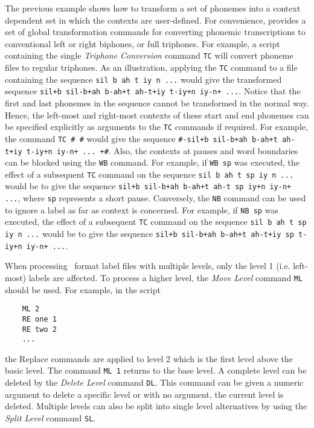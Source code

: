 The previous example shows how to transform a set of phonemes into a
context dependent set in which the contexts are user-defined.
 For
convenience,  provides a set of global transformation commands
for converting phonemic transcriptions to conventional left or right
biphones, or full triphones.  For example, a script containing the single
{\it Triphone Conversion} command \texttt{TC} will convert phoneme 
files to regular
triphones.  As an illustration, applying the \texttt{TC} command to a file
containing the sequence \texttt{sil b ah t iy n ...} would  give the
transformed sequence 
\texttt{sil+b sil-b+ah b-ah+t ah-t+iy t-iy+n iy-n+ ...}. Notice that the
first and last phonemes in the sequence  cannot be transformed in the
normal way.  Hence, the left-most and right-most contexts of these
start and end phonemes can be specified
explicitly as arguments to the \texttt{TC} commands if required.  For
example, the command \texttt{TC \# \#} would give the sequence
\texttt{\#-sil+b sil-b+ah b-ah+t ah-t+iy t-iy+n iy-n+ ... +\#}.  
Also, the contexts at pauses and word boundaries can be blocked
using the
\texttt{WB} command.   For example, if \texttt{WB sp} was executed, the
effect of a subsequent \texttt{TC} command on the sequence 
\texttt{sil b ah t sp iy n ...} would be to give the sequence 
\texttt{sil+b sil-b+ah b-ah+t ah-t sp iy+n iy-n+ ...}, 
where \texttt{sp} represents a short pause. Conversely, the \texttt{NB} 
command can be used to ignore a label as far as context is concerned.  For example,
if  \texttt{NB sp} was executed, the
effect of a subsequent \texttt{TC} command on the sequence 
\texttt{sil b ah t sp iy n ...} would be to give the sequence 
\texttt{sil+b sil-b+ah b-ah+t ah-t+iy sp t-iy+n iy-n+ ...}.

When processing \HTK\ format label files with multiple levels, only the 
level 1 (i.e. left-most) labels are affected.  To process a higher
level, the \textit{Move Level} command \texttt{ML} should be used.
For example, in the script
\begin{verbatim}
    ML 2
    RE one 1
    RE two 2
    ...
\end{verbatim}
the Replace commands are applied to level 2 which is the first level
above the basic level.  The command \texttt{ML 1} returns to the 
base level.  A complete level can be deleted by the 
\textit{Delete Level} command \texttt{DL}.  This command can
be given a numeric argument to delete a specific level or
with no argument, the current level is deleted.
Multiple levels can also be split into single level alternatives
by using the \textit{Split Level} command \texttt{SL}.

